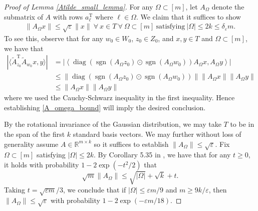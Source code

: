 \documentclass[11pt]{article}
\renewcommand{\epsilon}{\varepsilon}
\newcommand{\R}{\mathbb{R}}
\newcommand{\sgn}{\operatorname{sgn}}
\newcommand{\diag}{\operatorname{diag}}
\renewcommand{\top}{{\mathrm{T}}}
\theoremstyle{remark}
\begin{document}
\begin{proof}[Proof of Lemma \ref{Atilde_small_lemma}] For any $\Omega \subset [m]$, let $A_{\Omega}$ denote the submatrix of $A$ with rows $a_{\ell}^{\top}$ where $\ell \in \Omega$. We claim that it suffices to show \begin{align}
    \|A_{\Omega}x\| \leqslant \sqrt{\epsilon} \|x\|\ \forall\ x \in T\ \forall\ \Omega \subset [m]\ \text{satisfying}\ |\Omega| \leqslant 2k \leqslant \delta_{\epsilon} m. \label{A_omega_bound}
\end{align} To see this, observe that for any $w_0 \in W_0$, $z_0 \in Z_0$, and $x,y \in T$ and $\Omega \subset [m]$, we have that \begin{align*}
    |\langle\tilde{A}_{z_0}^\top \tilde{A}_{w_0} x,y \rangle | 
    & = \left|\left\langle \diag(\sgn(A_{\Omega}z_0) \odot \sgn(A_{\Omega}w_0))A_{\Omega}x,A_{\Omega}y\right\rangle\right| \\
    & \leqslant \|\diag(\sgn(A_{\Omega}z_0) \odot \sgn(A_{\Omega}w_0))\|\|A_{\Omega}x\|\|A_{\Omega}y\| \\
    & \leqslant \|A_{\Omega}x\|\|A_{\Omega}y\|
\end{align*} where we used the Cauchy-Schwarz inequality in the first inequality. Hence establishing \eqref{A_omega_bound} will imply the desired conclusion.

By the rotational invariance of the Gaussian distribution, we may take $T$ to be in the span of the first $k$ standard basis vectors. We may further without loss of generality assume $A \in \R^{m \times k}$ so it suffices to establish  $\|A_{\Omega}\| \leqslant \sqrt{\epsilon}$. Fix $\Omega \subset[m]$ satisfying $|\Omega| \leqslant 2k$. By Corollary 5.35 in \cite{Vershynin_notes}, we have that for any $t \geqslant 0$, it holds with probability $1 - 2\exp(-t^2/2)$ that $$\sqrt{m}\|A_{\Omega}\| \leqslant \sqrt{|\Omega|} + \sqrt{k} + t.$$ Taking $t = \sqrt{\epsilon m}/3$, we conclude that if $|\Omega| \leqslant \epsilon m/9$ and $m \geqslant 9k/\epsilon$, then $\|A_{\Omega}\| \leqslant \sqrt{\epsilon}$ with probability $1 - 2\exp(-\epsilon m/18).$


\end{proof}
\end{document}
